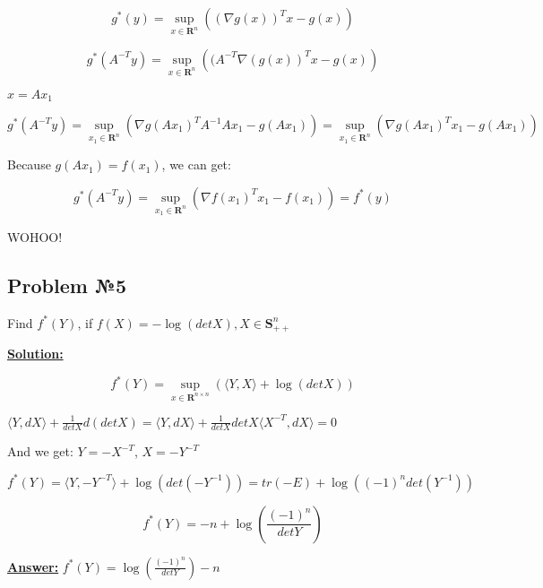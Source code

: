 \begin{equation*}
    g^*(y) = \sup_{x \in \mathbf{R}^n} \left( (\nabla g(x))^Tx - g(x) \right)
\end{equation*}

\begin{equation*}
    g^*(A^{-T}y) = \sup_{x \in \mathbf{R}^n} \left( (A^{-T}\nabla(g(x))^Tx - g(x) \right)
\end{equation*}

$x = Ax_1$

\begin{equation*}
    g^*(A^{-T}y) = \sup_{x_1 \in \mathbf{R}^n} \left( \nabla g(Ax_1)^T A^{-1}Ax_1 - g(Ax_1) \right) = \sup_{x_1 \in \mathbf{R}^n} \left( \nabla g(Ax_1)^Tx_1 - g(Ax_1)
    \right)
\end{equation*}

Because $g(Ax_1) = f(x_1)$, we can get:

\begin{equation*}
    g^*(A^{-T}y) = \sup_{x_1 \in \mathbf{R}^n} \left( \nabla f(x_1)^Tx_1 - f(x_1)\right) = f^*(y)
\end{equation*}
    
WOHOO!

\subsection{Problem №5}
Find $f^*(Y)$, if $f(X) = -\log( det X), X \in \mathbf{S}_{++}^n$

\underline{\textbf{Solution:}}

\begin{equation*}
    f^*(Y) = \sup_{x \in \mathbf{R}^{n \times n}} \left( \langle Y, X \rangle + \log(detX) \right)
\end{equation*}

$\langle Y, dX \rangle + \frac{1}{detX}d(detX) = \langle Y, dX \rangle + \frac{1}{detX}detX \langle X^{-T}, dX \rangle = 0$

And we get: $Y = - X^{-T}$, $X = -Y^{-T}$

\begin{equation*}
    f^*(Y) = \langle Y, - Y^{-T} \rangle + \log(det(-Y^{-1})) = tr(-E) + \log \left((-1)^n det(Y^{-1}) \right)
\end{equation*}

\begin{equation*}
    f^*(Y) = -n + \log \left( \frac{(-1)^n}{detY} \right)
\end{equation*}

\underline{\textbf{Answer:}}
$f^*(Y) = \log \left( \frac{(-1)^n}{detY} \right) - n$